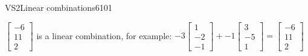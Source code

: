 \begin{exercise}{VS2}{Linear combinations}{6101}
\begin{exerciseAnswer}
\begin{itemize}
 \(\left[\begin{array}{c}
-6 \\
11 \\
2
\end{array}\right]\) is a linear combination, for example: \(
-3 \left[\begin{array}{c}
1 \\
-2 \\
-1
\end{array}\right] + -1 \left[\begin{array}{c}
3 \\
-5 \\
1
\end{array}\right] = \left[\begin{array}{c}
-6 \\
11 \\
2
\end{array}\right]
                            \) 

 
\end{itemize}

     \end{exerciseAnswer}
 \end{exercise}


